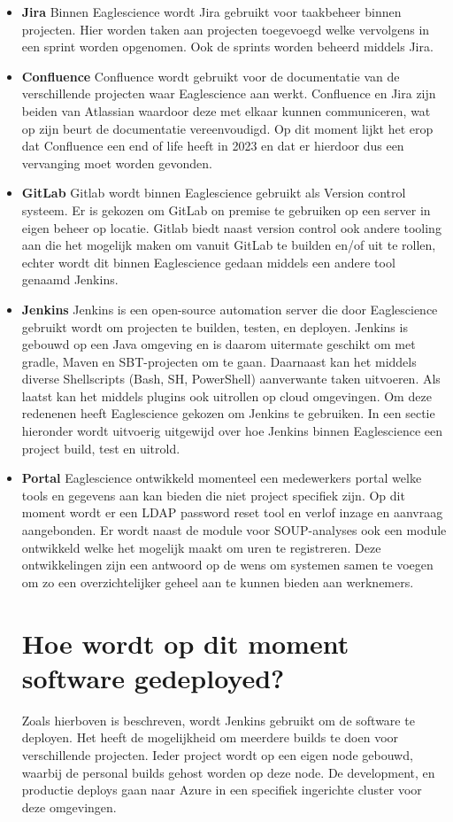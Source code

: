 \begin{itemize}
    \item \textbf{Jira}
    Binnen Eaglescience wordt Jira gebruikt voor taakbeheer binnen projecten. Hier worden taken aan projecten toegevoegd welke vervolgens in een sprint worden opgenomen. Ook de sprints worden beheerd middels Jira.
    \item \textbf{Confluence}
    Confluence wordt gebruikt voor de documentatie van de verschillende projecten waar Eaglescience aan werkt. Confluence en Jira zijn beiden van Atlassian waardoor deze met elkaar kunnen communiceren, wat op zijn beurt de documentatie vereenvoudigd. Op dit moment lijkt het erop dat Confluence een end of life heeft in 2023 en dat er hierdoor dus een vervanging moet worden gevonden.
    \item \textbf{GitLab}
    Gitlab wordt binnen Eaglescience gebruikt als Version control systeem. Er is gekozen om GitLab on premise te gebruiken op een server in eigen beheer op locatie. Gitlab biedt naast version control ook andere tooling aan die het mogelijk maken om vanuit GitLab te builden en/of uit te rollen, echter wordt dit binnen Eaglescience gedaan middels een andere tool genaamd Jenkins.
    \item \textbf{Jenkins}
    Jenkins is een open-source automation server die door Eaglescience gebruikt wordt om projecten te builden, testen, en deployen. Jenkins is gebouwd op een Java omgeving en is daarom uitermate geschikt om met gradle, Maven en SBT-projecten om te gaan. Daarnaast kan het middels diverse Shellscripts (Bash, SH, PowerShell) aanverwante taken uitvoeren. Als laatst kan het middels plugins ook uitrollen op cloud omgevingen. Om deze redenenen heeft Eaglescience gekozen om Jenkins te gebruiken. In een sectie hieronder wordt uitvoerig uitgewijd over hoe Jenkins binnen Eaglescience een project build, test en uitrold.
    \item \textbf{Portal}
    Eaglescience ontwikkeld momenteel een medewerkers portal welke tools en gegevens aan kan bieden die niet project specifiek zijn. Op dit moment wordt er een LDAP password reset tool en verlof inzage en aanvraag aangebonden. Er wordt naast de module voor SOUP-analyses ook een module ontwikkeld welke het mogelijk maakt om uren te registreren. Deze ontwikkelingen zijn een antwoord op de wens om systemen samen te voegen om zo een overzichtelijker geheel aan te kunnen bieden aan werknemers.


    \section{Hoe wordt op dit moment software gedeployed?} \label{sec:hoe-wordt-op-dit-moment-software-gedeployed?}
    Zoals hierboven is beschreven, wordt Jenkins gebruikt om de software te deployen. Het heeft de mogelijkheid om meerdere builds te doen voor verschillende projecten. Ieder project wordt op een eigen node gebouwd, waarbij de personal builds gehost worden op deze node. De development, en productie deploys gaan naar Azure in een specifiek ingerichte cluster voor deze omgevingen.


\end{itemize}
